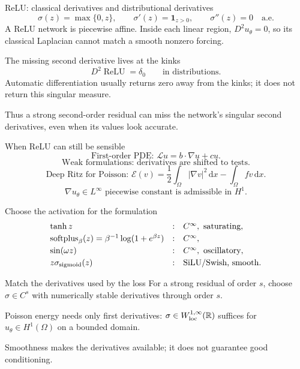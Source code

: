 \documentclass[aspectratio=43,11pt]{beamer}
\newcommand{\slideid}{L3}
\newcommand{\R}{\mathbb{R}}
\newcommand{\dd}{\,\mathrm d}
\newcommand{\Lop}{\mathcal{L}}
\newcommand{\Energy}{\mathcal{E}}
\newcommand{\labnote}[1]{{\scriptsize\color{courseBlue}#1\par}}
\begin{document}
\renewcommand{\slideid}{L3-S033}
\begin{frame}[c]{ReLU: classical derivatives and distributional derivatives}
\small
\[
\sigma(z)=\max\{0,z\},\qquad
\sigma'(z)=\mathbf1_{z>0},\qquad \sigma''(z)=0\quad\text{a.e.}
\]
A ReLU network is piecewise affine. Inside each linear region,
$D^2u_\theta=0$, so its classical Laplacian cannot match a smooth nonzero forcing.
\begin{block}{The missing second derivative lives at the kinks}
\[
D^2\operatorname{ReLU}=\delta_0\qquad\text{in distributions.}
\]
Automatic differentiation usually returns zero away from the kinks;
it does not return this singular measure.
\end{block}
\medskip
Thus a strong second-order residual can miss the network's singular
second derivatives, even when its values look accurate.
\end{frame}

\renewcommand{\slideid}{L3-S035}
\begin{frame}[c]{When ReLU can still be sensible}
\small
\[
\text{First-order PDE: } \Lop u=b\cdot\nabla u+cu.
\]
\[
\text{Weak formulations: derivatives are shifted to tests.}
\]
\[
\text{Deep Ritz for Poisson: } \Energy(v)=\frac12\int_\Omega|\nabla v|^2\dd x-\int_\Omega fv\dd x.
\]
\[
\nabla u_\theta \in L^\infty \text{ piecewise constant is admissible in }H^1.
\]
\end{frame}

\renewcommand{\slideid}{L3-S036}
\begin{frame}[c]{Choose the activation for the formulation}
\small
\[
\begin{array}{lll}
\tanh z &:& C^\infty,\ \text{saturating},\\[0.25em]
\operatorname{softplus}_\beta(z)=\beta^{-1}\log(1+e^{\beta z}) &:& C^\infty,\\[0.25em]
\sin(\omega z) &:& C^\infty,\ \text{oscillatory},\\[0.25em]
z\sigma_{\rm sigmoid}(z) &:& \text{SiLU/Swish, smooth}.
\end{array}
\]
\begin{block}{Match the derivatives used by the loss}
For a strong residual of order $s$, choose $\sigma\in C^s$ with numerically
stable derivatives through order $s$.
\medskip

Poisson energy needs only first derivatives:
$\sigma\in W^{1,\infty}_{\rm loc}(\R)$ suffices for $u_\theta\in H^1(\Omega)$
on a bounded domain.
\end{block}
\labnote{Smoothness makes the derivatives available; it does not guarantee good conditioning.}
\end{frame}
\end{document}
